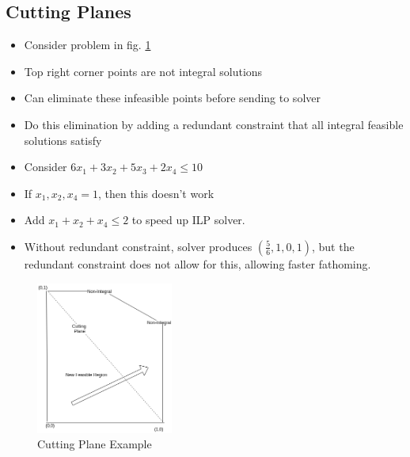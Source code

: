 \documentclass[12pt, letter]{article}
\begin{document}
\subsection*{Cutting Planes}
\begin{itemize}
    \item Consider problem in fig. \ref{fig:cutplane}
    \item Top right corner points are not integral solutions
    \item Can eliminate these infeasible points before sending to solver
    \item Do this elimination by adding a redundant constraint that all integral feasible solutions satisfy
    \item Consider $6x_1+3x_2+5x_3+2x_4 \le 10$ 
    \item If $x_1, x_2, x_4 = 1$, then this doesn't work
    \item Add $x_1+x_2+x_4 \le 2$ to speed up ILP solver.
    \item Without redundant constraint, solver produces $(\frac{5}{6}, 1, 0, 1)$, but the redundant constraint does not allow for this, allowing faster fathoming.
\end{itemize}

\begin{figure}[h]
    \centering
    \includegraphics[width=0.4\textwidth]{cutplane}
    \caption{Cutting Plane Example}
    \label{fig:cutplane}
\end{figure}
\end{document}
